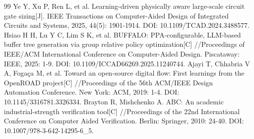 \documentclass[twocolumn,10pt,fontset=windows]{ctexart}
\begin{document}
\begin{thebibliography}{99}
 Ye Y, Xu P, Ren L, et al. Learning-driven physically aware large-scale circuit gate sizing[J]. IEEE Transactions on Computer-Aided Design of Integrated Circuits and Systems, 2025, 44(5): 1901-1914. DOI: 10.1109/TCAD.2024.3488577.
 Hsiao H H, Lu Y C, Lim S K, et al. BUFFALO: PPA-configurable, LLM-based buffer tree generation via group relative policy optimization[C] //Proceedings of IEEE/ACM International Conference on Computer-Aided Design. Piscataway: IEEE, 2025: 1-9. DOI: 10.1109/ICCAD66269.2025.11240744.
 Ajayi T, Chhabria V A, Fogaça M, et al. Toward an open-source digital flow: First learnings from the OpenROAD project[C] //Proceedings of the 56th ACM/IEEE Design Automation Conference. New York: ACM, 2019: 1-4. DOI: 10.1145/3316781.3326334.
 Brayton R, Mishchenko A. ABC: An academic industrial-strength verification tool[C] //Proceedings of the 22nd International Conference on Computer Aided Verification. Berlin: Springer, 2010: 24-40. DOI: 10.1007/978-3-642-14295-6\_5.
\end{thebibliography}
\end{document}
